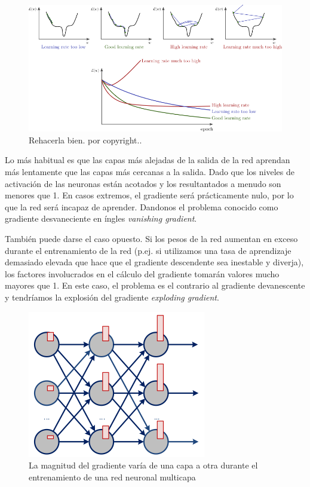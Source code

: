 \begin{figure}[H]
 \centering
 \includegraphics[scale=0.5]{../Figuras/gradiente.png}
 \caption{Rehacerla bien. por copyright..}
 \label{fig:gradiente}
\end{figure}

Lo más habitual es que las capas más alejadas de la salida de la red aprendan más lentamente que las capas más cercanas a la salida. Dado que los niveles de activación de las neuronas están acotados y los resultantados a menudo son menores que 1. En casos extremos, el gradiente será prácticamente nulo, por lo que la red será incapaz de aprender. Dandonos el 
 problema conocido como gradiente desvaneciente en íngles \emph{vanishing gradient}.

 También puede darse el caso opuesto. Si los pesos de la red aumentan en exceso durante el entrenamiento de la red (p.ej. si utilizamos una tasa de aprendizaje demasiado elevada que hace que el gradiente descendente sea inestable y diverja), los factores involucrados en el cálculo del gradiente tomarán valores mucho mayores que 1. En este caso, el problema es el contrario al gradiente devanescente y tendríamos la explosión del gradiente \emph{exploding gradient}.

\begin{figure}[H]
 \centering
 \includegraphics[scale=0.8]{../Figuras/vanish.png}
 \caption{La magnitud del gradiente varía de una capa a otra durante el entrenamiento de una red neuronal multicapa}
 \label{fig:vanish}
\end{figure}

